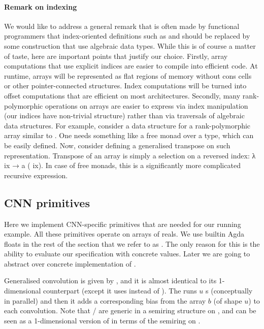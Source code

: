 \paragraph{Remark on indexing} We would like to address a general remark that
is often made by functional programmers that index-oriented definitions such as
 and  should be replaced by some construction that use
algebraic data types.  While this is of course a matter of taste, here are
important points that justify our choice. Firstly, array computations that use
explicit indices are easier to compile into efficient code. At runtime, arrays
will be represented as flat regions of memory without cons cells or other
pointer-connected structures. Index computations will be turned into offset
computations that are efficient on most architectures.  Secondly, many
rank-polymorphic operations on arrays are easier to express via index
manipulation (our indices have non-trivial structure) rather than via
traversals of algebraic data structures.  For example, consider a data
structure for a rank-polymorphic array similar to .  One needs something
like a free monad over a  type, which can be easily defined.  Now,
consider defining a generalised transpose on such representation.  Transpose of
an  array is simply a selection on a reversed index: λ ix → a
( ix). In case of free monads, this is a significantly more
complicated recursive expression.






\subsection{CNN primitives\label{sec:ar-cnn-prim}}
Here we implement CNN-specific primitives that are needed for our running example.
All these primitives operate on arrays of reals.  We use builtin Agda floats in
the rest of the section that we refer to as .  The only reason for this
is the ability to evaluate our specification with concrete values.
Later we are going to abstract over concrete implementation of .

Generalised convolution is given by , and it is almost identical to its
1-dimensional counterpart (except it uses  instead of ).
The  runs $u$ s (conceptually in parallel) and then it adds a
corresponding bias from the array $b$ (of shape $u$) to each convolution.
Note that / are generic in a semiring structure on ,
and  can be seen as a 1-dimensional version of  in terms
of the semiring on .

